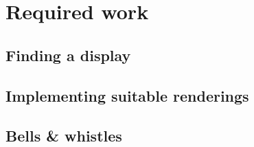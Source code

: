 \section{Required work}
\subsection{Finding a display}
\subsection{Implementing suitable renderings}
\subsection{Bells \& whistles} %